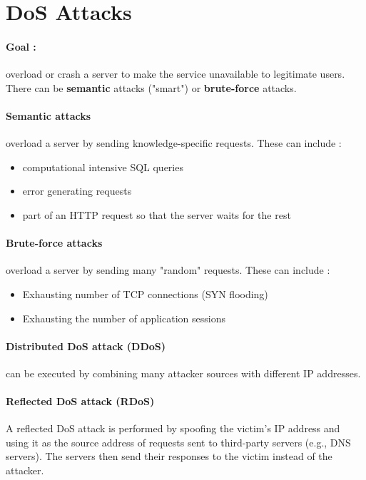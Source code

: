 \section{DoS Attacks}
\paragraph{Goal :} overload or crash a server to make the service unavailable to legitimate users. There can be \textbf{semantic} attacks ("smart") or \textbf{brute-force} attacks.

\paragraph{Semantic attacks } overload a server by sending knowledge-specific requests. These can include : 
\begin{itemize}
    \item computational intensive SQL queries
    \item error generating requests
    \item part of an HTTP request so that the server waits for the rest
\end{itemize}

\paragraph{Brute-force attacks } overload a server by sending many "random" requests. These can include : 
\begin{itemize}
    \item Exhausting number of TCP connections (SYN flooding)
    \item Exhausting the number of application sessions
\end{itemize}

\paragraph{Distributed DoS attack (DDoS)}  can be executed by combining many attacker sources with different IP addresses.


\paragraph{Reflected DoS attack (RDoS)}

A reflected DoS attack is performed by spoofing the victim's IP address and using it as the source address of requests sent to third-party servers (e.g., DNS servers). The servers then send their responses to the victim instead of the attacker.

